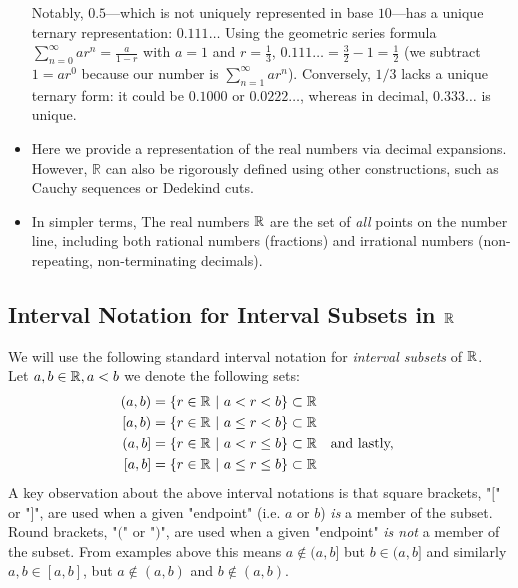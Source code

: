 \begin{itemize}
{    Notably, $0.5$—which is not uniquely represented in base $10$—has a unique ternary representation: $0.111\ldots$ Using the geometric series formula $\sum_{n=0}^\infty ar^n = \frac{a}{1-r}$ with $a=1$ and $r=\frac{1}{3}$, $0.111\ldots = \frac{3}{2} - 1 = \frac{1}{2}$ (we subtract $1=ar^0$ because our number is $\sum_{n=1}^\infty ar^n$). Conversely, $1/3$ lacks a unique 
    ternary form: it could be $0.1000$ or $0.0222\ldots$, whereas in decimal, $0.333\ldots$ is unique.}
    \item Here we provide a representation of the real numbers via decimal expansions. However, \(\mathbb{R}\) can also be rigorously defined using other constructions, such as Cauchy sequences or Dedekind cuts.
    \item In simpler terms, The real numbers ${\mathbb{ R}}$ are the set of \textit{all} points on the number line, including both rational numbers (fractions) and irrational numbers (non-repeating, non-terminating decimals).
\end{itemize}
\subsection{Interval Notation for Interval Subsets in ${\mathbb{ R}}$}
We will use the following standard interval notation for \textit{interval subsets} of ${\mathbb{ R}}$.\\ 
Let $a,b\in {\mathbb{ R}}, a<b$ we denote the following sets:
\begin{align}
    (a,b)&= \{r\in \R \ | \ a<r<b \} \subset \R \nonumber \\
    [a,b)&= \{r\in \R \ | \ a\leq r<b \} \subset \R \nonumber \\
    (a,b]&= \{r\in \R \ | \ a< r\leq b \} \subset \R \quad \text{and lastly, } \nonumber \\
    [a,b]&= \{r\in \R \ | \ a\leq r \leq b \} \subset \R \nonumber
\end{align}
\noindent A key observation about the above interval notations is that square brackets, "$[$" or "$]$", are used when a given "endpoint" (i.e. $a$ or $b$) \textit{is} a member of the subset. Round brackets, "$($" or "$)$", are used when a given "endpoint" \textit{is not} a member of the subset. From examples above this means $a\not \in (a,b]$ but $b\in (a,b]$ and similarly $a,b\in [a,b]$, but $a\not \in (a,b)$ and $b \not \in (a,b)$.
\newpage

